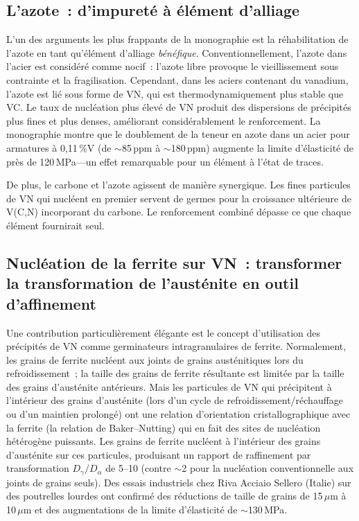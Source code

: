 \documentclass[11pt,a4paper]{article}
\begin{document}
\subsection{L'azote~: d'impuret\'e \`a \'el\'ement d'alliage}

L'un des arguments les plus frappants de la monographie est la
r\'ehabilitation de l'azote en tant qu'\'el\'ement d'alliage
\emph{b\'en\'efique}.  Conventionnellement, l'azote dans l'acier est
consid\'er\'e comme nocif~: l'azote \og libre \fg{} provoque le
vieillissement sous contrainte et la fragilisation.  Cependant, dans les
aciers contenant du vanadium, l'azote est li\'e sous forme de VN, qui
est thermodynamiquement plus stable que VC.  Le taux de nucl\'eation
plus \'elev\'e de VN produit des dispersions de pr\'ecipit\'es plus
fines et plus denses, am\'eliorant consid\'erablement le renforcement.
La monographie montre que le doublement de la teneur en azote dans un
acier pour armatures \`a 0,11\,\%V (de $\sim$85\,ppm \`a
$\sim$180\,ppm) augmente la limite d'\'elasticit\'e de pr\`es de
120\,MPa---un effet remarquable pour un \'el\'ement \`a l'\'etat de
traces.

De plus, le carbone et l'azote agissent de mani\`ere synergique.  Les
fines particules de VN qui nucl\'eent en premier servent de germes pour
la croissance ult\'erieure de V(C,N) incorporant du carbone.  Le
renforcement combin\'e d\'epasse ce que chaque \'el\'ement fournirait
seul.

\subsection{Nucl\'eation de la ferrite sur VN~: transformer la
  transformation de l'aust\'enite en outil d'affinement}

Une contribution particuli\`erement \'el\'egante est le concept
d'utilisation des pr\'ecipit\'es de VN comme germinateurs
intragranulaires de ferrite.  Normalement, les grains de ferrite
nucl\'eent aux joints de grains aust\'enitiques lors du
refroidissement~; la taille des grains de ferrite r\'esultante est
limit\'ee par la taille des grains d'aust\'enite ant\'erieurs.  Mais les
particules de VN qui pr\'ecipitent \`a l'int\'erieur des grains
d'aust\'enite (lors d'un cycle de refroidissement/r\'echauffage ou d'un
maintien prolong\'e) ont une relation d'orientation cristallographique
avec la ferrite (la relation de Baker--Nutting) qui en fait des sites de
nucl\'eation h\'et\'erog\`ene puissants.  Les grains de ferrite
nucl\'eent \`a l'int\'erieur des grains d'aust\'enite sur ces
particules, produisant un rapport de raffinement par transformation
$D_\gamma/D_\alpha$ de 5--10 (contre $\sim$2 pour la nucl\'eation
conventionnelle aux joints de grains seuls).  Des essais industriels
chez Riva Acciaio Sellero (Italie) sur des poutrelles lourdes ont
confirm\'e des r\'eductions de taille de grains de 15\,$\mu$m \`a
10\,$\mu$m et des augmentations de la limite d'\'elasticit\'e de
$\sim$130\,MPa.
\end{document}
